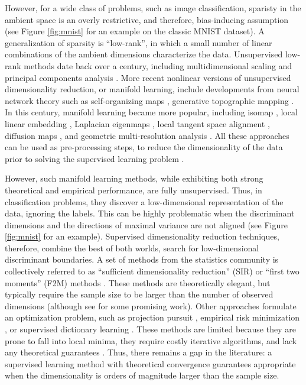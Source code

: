\documentclass[10pt]{article}
\begin{document}
However, for a wide class of problems, such as image classification, sparisty in the ambient space is an overly restrictive, and therefore, bias-inducing assumption (see Figure \ref{fig:mnist} for an example on the classic MNIST dataset). A generalization of sparsity is ``low-rank'', in which a  small number of linear combinations of the ambient dimensions characterize the data.  Unsupervised low-rank methods date back over a century, including multidimensional scaling \cite{Householder1938,Borg2005} and principal components analysis \cite{Pearson1901a,Jolliffe2002a}. More recent nonlinear versions of unsupervised dimensionality reduction, or manifold learning, include developments from neural network theory such as self-organizing maps \cite{Kohonen1982a}, generative topographic mapping \cite{Bishop1998a}. In this century, manifold learning became more popular, including isomap \cite{Tenenbaum2000a}, local linear embedding \cite{Roweis2000a}, Laplacian eigenmaps \cite{Belkin2003a}, local tangent space alignment \cite{Zhang2004f}, diffusion maps \cite{Coifman2006a},  and geometric multi-resolution analysis \cite{Allard2012}.  All these approaches can be used as pre-processing steps, to reduce the dimensionality of the data prior to solving the supervised learning problem \cite{Belhumeur1997a}.

However, such manifold learning methods, while exhibiting both strong theoretical \cite{Eckart1936a,deSilva2003, Allard2012} and empirical performance, are fully unsupervised.  Thus, in classification problems, they discover a low-dimensional representation of the data, ignoring the labels.  This can be highly problematic when the discriminant dimensions and the directions of maximal variance are not aligned (see Figure \ref{fig:mnist} for an example).  Supervised dimensionality reduction techniques, therefore, combine the best of both worlds, search for low-dimensional discriminant boundaries.  A set of methods from the statistics community is collectively referred to as   ``sufficient dimensionality reduction'' (SIR) or ``first two moments'' (F2M) methods  \cite{Li1991a, Tishby1999a, Globerson2003a, Cook2005a,Fukumizu2004a}.  These methods are theoretically elegant, but typically require the sample size to be larger than the number of observed dimensions (although see \cite{Cook2013} for some promising work).  Other approaches formulate an optimization problem, such as projection pursuit \cite{Huber1985a}, empirical risk minimization \cite{Belkin2006a}, or supervised dictionary learning \cite{Mairal2009}.  These methods are limited because they are prone to fall into local minima, they require costly iterative algorithms, and lack any theoretical guarantees \cite{Belkin2006a}.   Thus, there remains a gap in the literature: a supervised learning method with theoretical convergence guarantees appropriate when the dimensionality is orders of magnitude larger than the sample size.
\end{document}
